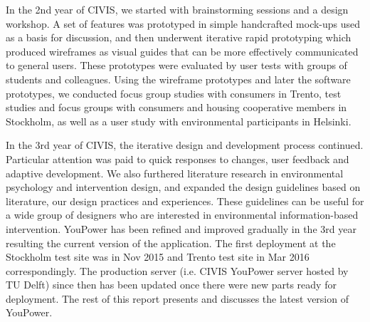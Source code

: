 In the 2nd year of CIVIS, we started with brainstorming sessions and a design workshop. A set of features was prototyped in simple handcrafted mock-ups used as a basis for discussion, and then underwent iterative rapid prototyping which produced wireframes as visual guides that can be more effectively communicated to general users. These prototypes were evaluated by user tests with groups of students and colleagues. Using the wireframe prototypes and later the software prototypes, we conducted focus group studies with consumers in Trento, test studies and focus groups with consumers and housing cooperative members in Stockholm, as well as a user study with environmental participants in Helsinki. 

In the 3rd year of CIVIS, the iterative design and development process continued. Particular attention was paid to quick responses to changes, user feedback and adaptive development. We also furthered literature research in environmental psychology and intervention design, and expanded the design guidelines based on literature, our design practices and experiences. These guidelines can be useful for a wide group of designers who are interested in environmental information-based intervention. YouPower has been refined and improved gradually in the 3rd year resulting the current version of the application. The first deployment at the Stockholm test site was in Nov 2015 and Trento test site in Mar 2016 correspondingly. The production server (i.e. CIVIS YouPower server hosted by TU Delft) since then has been updated once there were new parts ready for deployment.  
The rest of this report presents and discusses the latest version of YouPower. 

 
 

